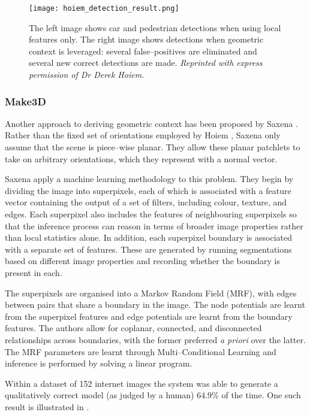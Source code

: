 \begin{figure}[tb]
\centering
\texttt{[image: hoiem\_detection\_result.png]}
\caption{The left image shows car and pedestrian detections when using
  local features only. The right image shows detections when geometric
  context is leveraged: several false--positives are eliminated and
  several new correct detections are made.
  \textit{Reprinted with express permission of Dr Derek Hoiem.}
  }
\label{fig:hoiem-result}
\end{figure}

\subsubsection{Make3D}

Another approach to deriving geometric context has been proposed by
Saxena \etal \cite{Saxena09}. Rather than the fixed set of
orientations employed by Hoiem \etal, Saxena \etal only assume that
the scene is piece--wise planar. They allow these planar patchlets to
take on arbitrary orientations, which they represent with a normal
vector.

Saxena \etal apply a machine learning methodology to this
problem. They begin by dividing the image into superpixels, each of
which is associated with a feature vector containing the output of a
set of filters, including colour, texture, and edges. Each superpixel
also includes the features of neighbouring superpixels so that the
inference process can reason in terms of broader image properties
rather than local statistics alone. In addition, each superpixel
boundary is associated with a separate set of features. These are
generated by running segmentations based on different image properties
and recording whether the boundary is present in each.

The superpixels are organised into a Markov Random Field (MRF), with
edges between pairs that share a boundary in the image. The node
potentials are learnt from the superpixel features and edge
potentials are learnt from the boundary features. The authors allow
for coplanar, connected, and disconnected relationships across
boundaries, with the former preferred \textit{a priori} over the
latter. The MRF parameters are learnt through Multi--Conditional
Learning and inference is performed by solving a linear program.

Within a dataset of 152 internet images the system was able to
generate a qualitatively correct model (as judged by a human) 64.9\%
of the time. One such result is illustrated in .

